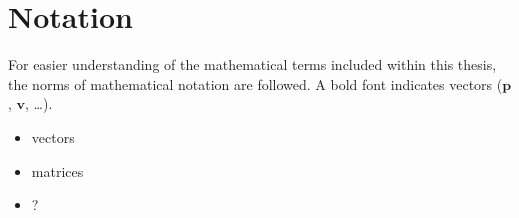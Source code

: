 \section{Notation}
\newcommand{\vect}[1]{\mathbf{#1}}
For easier understanding of the mathematical terms included within this thesis, the norms of mathematical notation are followed. A bold font indicates vectors ($\vect{p}$, $\vect{v}$, \dots).

\begin{itemize}
	\item vectors
	\item matrices
	\item ?
\end{itemize}
